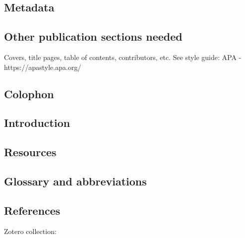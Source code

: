 \documentclass[
  letterpaper,
  DIV=11,
  numbers=noendperiod]{scrreprt}
\begin{document}
\subsection{Metadata}\label{metadata}

\subsection{Other publication sections
needed}\label{other-publication-sections-needed}

Covers, title pages, table of contents, contributors, etc. See style
guide: APA - https://apastyle.apa.org/

\subsection{Colophon}\label{colophon}

\subsection{Introduction}\label{introduction}

\subsection{Resources}\label{resources}

\subsection{Glossary and
abbreviations}\label{glossary-and-abbreviations}

\subsection{References}\label{references}

Zotero collection:
\end{document}
